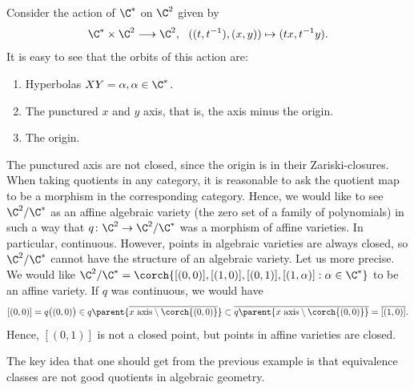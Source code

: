 {\begin{example} \label{example_G_m_acting_A2}
    Consider the action of $\C^*$ on $\C^2$ given by
    \[
         \C^* \times \C^2 \longrightarrow  \C^2, \ \  ((t,t^{-1}),(x,y)) \mapsto  (tx, t^{-1}y).
    \]
    It is easy to see that the orbits of this action are:
    \begin{enumerate}
        \item Hyperbolas $XY=\alpha, \alpha \in \C^*$.
        \item The punctured $x$ and $y$ axis, that is, the axis minus the origin. 
        \item The origin.
    \end{enumerate}
    The punctured axis are not closed, since the origin is in their Zariski-closures. When taking quotients in any category, it is reasonable to ask the quotient map to be a morphism in the corresponding category. Hence, we would like to see \(\C^2/\C^*\) as an affine algebraic variety (the zero set of a family of polynomials) in such a way that \(q\colon \C^2 \to \C^2/\C^*\) was a morphism of affine varieties. In particular, continuous. However, points in algebraic varieties are always closed, so $\C^2/\C^*$ cannot have the structure of an algebraic variety. Let us more precise. We would like \(\C^2/\C^*=\corch{[(0,0)], [(1,0)], [(0,1)], [(1, \alpha)]: \alpha \in \C^*}\) to be an affine variety. If \(q\) was continuous, we would have
    \[
    [(0,0)]=q\big( (0,0)\big) \in q \parent{ \overline{x\ \mathrm{axis}\setminus \corch{(0,0)} }} \subset \overline{q\parent{x \ \mathrm{axis} \setminus \corch{(0,0)} }}= \overline{[(1,0)]}.
    \]
    Hence, \([(0,1)]\) is not a closed point, but points in affine varieties are closed.
\end{example}

The key idea that one should get from the previous example is that equivalence classes are not good quotients in algebraic geometry. \\

}
